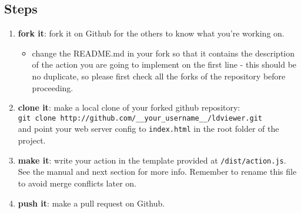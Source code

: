 \documentclass{article}
\begin{document}
\subsection{Steps}
\begin{enumerate}
\item \textbf{fork it}: fork it on Github for the others to know what you're working on.
\begin{itemize}
\item change the README.md in your fork so that it contains the description of the action you are going to implement on the first line - this should be no duplicate, so please first check all the forks of the repository before proceeding.
\end{itemize}
\item \textbf{clone it}: make a local clone of your forked github repository:\\
\texttt{git clone http://github.com/\_\_your\_username\_\_/ldviewer.git}\\
and point your web server config to \texttt{index.html} in the root folder of the project.
\item \textbf{make it}: write your action in the template provided at \texttt{/dist/action.js}.\\ See the manual and next section for more info. Remember to rename this file to avoid merge conflicts later on.
\item \textbf{push it}: make a pull request on Github.
\end{enumerate}
\end{document}
